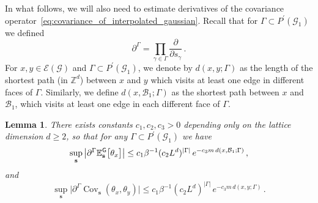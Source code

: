 \documentclass[11pt]{article}
\newtheorem{lemma}[theorem]{Lemma}
\theoremstyle{definition}
\theoremstyle{remark}
\numberwithin{theorem}{section}
\def\Ga{{\Gamma}}
\newcommand{\bZ}{\mathbb Z}
\newcommand{\bE}{\mathbb E}
\newcommand{\cE}{\mathcal{E}}
\newcommand{\cG}{\mathcal G}
\newcommand{\Cov}{\operatorname{Cov}}
\begin{document}
    In what follows, we will also need to estimate derivatives of the covariance operator~\eqref{eq:covariance_of_interpolated_gaussian}. Recall that for $\Ga\subset P^\prime(\mathcal{G}_1)$ we defined 
    \[
    \partial^\Ga = \prod_{\gamma\in \Ga} \frac{\partial}{\partial s_\gamma} \, .
    \]
    For $x,y\in \cE(\cG)$ and $\Ga\subset P^\prime(\mathcal{G}_1)$, we denote by $d(x,y;\Ga)$ as the length of the shortest path (in $\bZ^d$) between $x$ and $y$ which visits at least one edge in different faces of $\Ga$. Similarly, we define $d(x,\mathcal{B}_1;\Ga)$ as the shortest path between $x$ and $\mathcal{B}_1$, which visits at least one edge in each different face of $\Ga$. 
    \begin{lemma}
        \label{lemma:estimate_on_derivative_of_covariance}
        There exists constants $c_1,c_2,c_3>0$ depending only on the lattice dimension $d\ge 2$, so that for any $\Ga\subset P^\prime(\mathcal{G}_1)$ we have 
        \[
        \sup_{\mathbf{s}} \big| \partial^\Ga \bE_{\mathbf{s}}^{\sf G}\big[\theta_x \big]\big| \le c_1 \beta^{-1} (c_2 L^d)^{|\Ga|} \,  e^{-c_3 m \, d(x,\mathcal{B}_1;\Ga)} \, , 
        \]
        and
        \[
        \sup_{\mathbf{s}} \big| \partial^\Ga \Cov_{\mathbf{s}}(\theta_x,\theta_y) \big| \le c_1 \beta^{-1} (c_2L^d)^{|\Ga|} \, e^{-c_3 m \, d(x,y ;\Ga)} \, .
        \]
    \end{lemma}
\end{document}
